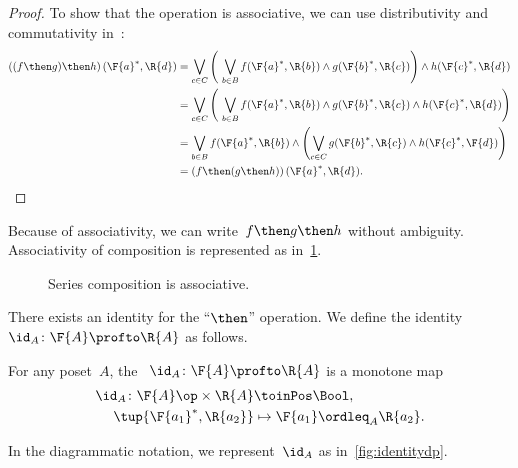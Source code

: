 \begin{proof}
    To show that the operation is associative, we can use distributivity and commutativity in~\Bool:
%
    \begin{equation}
        \begin{aligned}
            \left((f\then g) \then h\right) (\F{a}^*,\R{d})
            &= \bigvee_{c \in C} \left (\ \bigvee_{b\in B } f(\F{a}^*,\R{b}) \wedge g(\F{b}^*,\R{c}) \right )  \wedge  h (\F{c}^*, \R{d}) \\
            &= \bigvee_{c \in C} \left (\ \bigvee_{b\in B } f(\F{a}^*,\R{b})
            \wedge g(\F{b}^*,\R{c}) \wedge h (\F{c}^*, \R{d})
            \right ) \\
            &= \bigvee_{b \in B } f(\F{a}^*,\R{b}) \wedge \left ( \bigvee_{c\in C} g(\F{b}^*,\R{c}) \wedge h (\F{c}^*, \F{d}) \right ) \\
            &= \left(f \then (g \then h )\right) (\F{a}^*, \R{d}).
        \end{aligned}
    \end{equation}
%
\end{proof}

Because of associativity, we can write~$f\then g\then h$ without ambiguity.
Associativity of composition is represented as in~\cref{fig:compositionassociativity}.

\begin{figure}[h!]
    \begin{center}
    \end{center}
    \caption{Series composition is associative. \label{fig:compositionassociativity}}
\end{figure}

There exists an identity for the ``$\then$'' operation.
We define the identity~$\id_A\colon \F{A} \profto \R{A}$ as follows.

\begin{definition} \label{def:dp-identity}
    For any poset~$A$, the \emph{}~$\id_A\colon \F{A} \profto \R{A}$ is a monotone map
    \begin{equation}
        \begin{aligned}
            \id_A \colon \F{A}\op \times \R{A} & \toinPos   \Bool, \label{eq:identity}\\
            \tup{\F{a_1}^*, \R{a_2}} & \mapsto \F{a_1} \ordleq_{A} \R{a_2}.
        \end{aligned}
    \end{equation}
\end{definition}
In the diagrammatic notation, we represent~$\id_A$ as in~\cref{fig:identitydp}.

